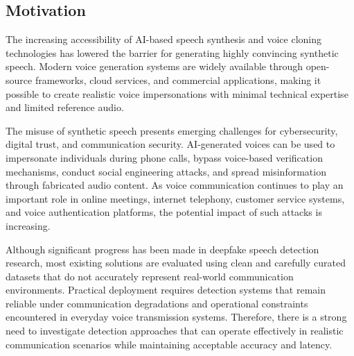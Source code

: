 \subsection{Motivation}

The increasing accessibility of AI-based speech synthesis and voice cloning technologies has lowered the barrier for generating highly convincing synthetic speech. Modern voice generation systems are widely available through open-source frameworks, cloud services, and commercial applications, making it possible to create realistic voice impersonations with minimal technical expertise and limited reference audio.

The misuse of synthetic speech presents emerging challenges for cybersecurity, digital trust, and communication security. AI-generated voices can be used to impersonate individuals during phone calls, bypass voice-based verification mechanisms, conduct social engineering attacks, and spread misinformation through fabricated audio content. As voice communication continues to play an important role in online meetings, internet telephony, customer service systems, and voice authentication platforms, the potential impact of such attacks is increasing.

Although significant progress has been made in deepfake speech detection research, most existing solutions are evaluated using clean and carefully curated datasets that do not accurately represent real-world communication environments. Practical deployment requires detection systems that remain reliable under communication degradations and operational constraints encountered in everyday voice transmission systems. Therefore, there is a strong need to investigate detection approaches that can operate effectively in realistic communication scenarios while maintaining acceptable accuracy and latency.
